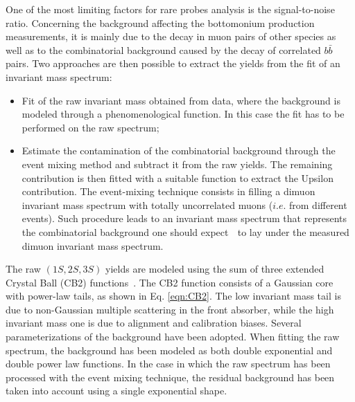 One of the most limiting factors for rare probes analysis is the signal-to-noise ratio.
Concerning the background affecting the bottomonium production measurements, it is mainly due to the decay in muon pairs of other species as well as to the combinatorial background caused by the decay of correlated $b\bar{b}$ pairs.
Two approaches are then possible to extract the yields from the fit of an invariant mass spectrum:
\begin{itemize}
\item Fit of the raw invariant mass obtained from data, where the background is modeled through a phenomenological function. In this case the fit has to be performed on the raw spectrum;
\item Estimate the contamination of the combinatorial background through the event mixing method and subtract it from the raw yields. The remaining contribution is then fitted with a suitable function to extract the Upsilon contribution. The event-mixing technique consists in filling a dimuon invariant mass spectrum with totally uncorrelated muons ($i.e.$ from different events). Such procedure leads to an invariant mass spectrum that represents the combinatorial background one should expect  to lay under the measured dimuon invariant mass spectrum.
\end{itemize}

The raw \upsi$(1S,2S,3S)$ yields are modeled using the sum of three extended Crystal Ball (CB2) functions~\cite{ALICE-Quarkonia-signal-extraction}. 
The CB2 function consists of a Gaussian core with  power-law tails, as shown in Eq. \ref{eqn:CB2}.
The low invariant mass tail is due to non-Gaussian multiple scattering in the front absorber, while the high invariant mass one is due to alignment and calibration biases.
Several parameterizations of the background have been adopted.
When fitting the raw spectrum, the background has been modeled as both double exponential and double power law functions.
In the case in which the raw spectrum has been processed with the event mixing technique, the residual background has been taken into account using a single exponential shape.

